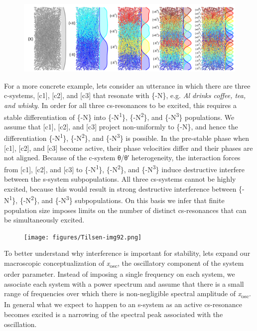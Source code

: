   
\begin{figure}
\includegraphics[width=\textwidth]{figures/Tilsen-img91.png}
\caption{\missingcaption}
\label{fig:4:41}
\end{figure}
 

  For a more concrete example, lets consider an utterance in which there are three c-systems, [c1], [c2], and [c3] that resonate with \{-N\}, e.g. \textit{Al drinks coffee, tea, and whisky}. In order for all three cs-resonances to be excited, this requires a stable differentiation of \{-N\} into \{-N\textsuperscript{1}\}, \{-N\textsuperscript{2}\}, and \{-N\textsuperscript{3}\} populations. We assume that [c1], [c2], and [c3] project non-uniformly to \{-N\}, and hence the differentiation \{-N\textsuperscript{1}\}, \{-N\textsuperscript{2}\}, and \{-N\textsuperscript{3}\} is possible. In the pre-stable phase when [c1], [c2], and [c3] become active, their phase velocities differ and their phases are not aligned. Because of the c-system θ/θ′ heterogeneity, the interaction forces from [c1], [c2], and [c3] to \{-N\textsuperscript{1}\}, \{-N\textsuperscript{2}\}, and \{-N\textsuperscript{3}\} induce destructive interfere between the s-system subpopulations. All three cs-systems cannot be highly excited, because this would result in strong destructive interference between \{-N\textsuperscript{1}\}, \{-N\textsuperscript{2}\}, and \{-N\textsuperscript{3}\} subpopulations. On this basis we infer that finite population size imposes limits on the number of distinct cs-resonances that can be simultaneously excited.

  
\begin{figure}
\texttt{[image: figures/Tilsen-img92.png]}
\caption{\missingcaption}
\label{fig:4:42}
\end{figure}
 

  To better understand why interference is important for stability, lets expand our macroscopic conceptualization of \textit{x}\textsubscript{osc}, the oscillatory component of the system order parameter. Instead of imposing a single frequency on each system, we associate each system with a power spectrum and assume that there is a small range of frequencies over which there is non-negligible spectral amplitude of \textit{x}\textsubscript{osc}. In general what we expect to happen to an s-system as an active cs-resonance becomes excited is a narrowing of the spectral peak associated with the oscillation.

